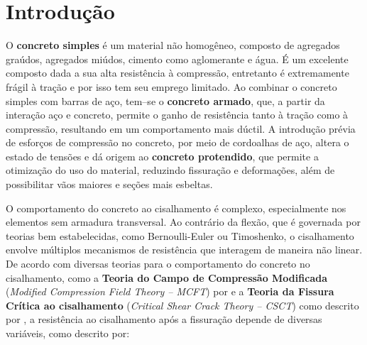 


\frenchspacing

\imprimircapa
\cleardoublepage
\imprimirfolhaderosto

\tableofcontents*
\cleardoublepage

\textual

\chapter[Introdução]{Introdução}

O \textbf{concreto simples} é um material não homogêneo, composto de agregados graúdos, agregados miúdos, cimento como aglomerante e água. É um excelente composto dada a sua alta resistência à compressão, entretanto é extremamente frágil à tração e por isso tem seu emprego limitado. Ao combinar o concreto simples com barras de aço, tem--se o \textbf{concreto armado}, que, a partir da interação aço e concreto, permite o ganho de resistência tanto à tração como à compressão, resultando em um comportamento mais dúctil. A introdução prévia de esforços de compressão no concreto, por meio de cordoalhas de aço, altera o estado de tensões e dá origem ao \textbf{concreto protendido}, que permite a otimização do uso do material, reduzindo fissuração e deformações, além de possibilitar vãos maiores e seções mais esbeltas.\cite{Araujo2023}

O comportamento do concreto ao cisalhamento é complexo, especialmente nos elementos sem armadura transversal. Ao contrário da flexão, que é governada por teorias bem estabelecidas, como Bernoulli-Euler ou Timoshenko, o cisalhamento envolve múltiplos mecanismos de resistência que interagem de maneira não linear. De acordo com diversas teorias para o comportamento do concreto no cisalhamento, como a \textbf{Teoria do Campo de Compressão Modificada} (\textit{Modified Compression Field Theory -- MCFT}) por \textcite{Vecchio1986} e a \textbf{Teoria da Fissura Crítica ao cisalhamento} (\textit{Critical Shear Crack Theory -- CSCT}) como descrito por \textcite{Muttoni2023}, a resistência ao cisalhamento após a fissuração depende de diversas variáveis, como descrito por:

